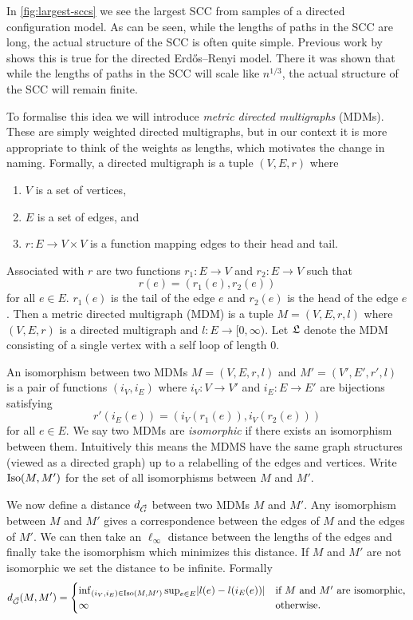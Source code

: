 In \cref{fig:largest-sccs} we see the largest SCC from samples of a directed configuration model. As can be seen, while the lengths of paths in the SCC are long, the actual structure of the SCC is often quite simple. Previous work by \citet{goldschmidtScalingLimitCritical2019} shows this is true for the directed Erdős--Renyi model. There it was shown that while the lengths of paths in the SCC will scale like $n^{1/3}$, the actual structure of the SCC will remain finite.

To formalise this idea we will introduce \emph{metric directed multigraphs} (MDMs). These are simply weighted directed multigraphs, but in our context it is more appropriate to think of the weights as lengths, which motivates the change in naming. Formally, a directed multigraph is a tuple $(V, E, r)$ where
\begin{enumerate}
    \item $V$ is a set of vertices,
    \item $E$ is a set of edges, and
    \item $r: E \to V \times V$ is a function mapping edges to their head and tail.
\end{enumerate}
Associated with $r$ are two functions $r_1: E \to V$ and $r_2: E \to V$ such that
\begin{equation*}
    r(e) = (r_1(e), r_2(e))
\end{equation*}
for all $e \in E$. $r_1(e)$ is the tail of the edge $e$ and $r_2(e)$ is the head of the edge $e$. Then a metric directed multigraph (MDM) is a tuple $M = (V, E, r, l)$ where $(V, E, r)$ is a directed multigraph and $l:E \to [0, \infty)$. Let $\mathfrak L$ denote the MDM consisting of a single vertex with a self loop of length 0.

An isomorphism between two MDMs $M = (V, E, r, l)$ and $M' = (V', E', r', l)$ is a pair of functions $(i_V, i_E)$ where $i_V: V \to V'$ and $i_E: E \to E'$ are bijections satisfying
\begin{equation*}
    r'(i_E(e)) = (i_V(r_1(e)), i_V(r_2(e)))
\end{equation*}
for all $e \in E$. We say two MDMs are \emph{isomorphic} if there exists an isomorphism between them. Intuitively this means the MDMS have the same graph structures (viewed as a directed graph) up to a relabelling of the edges and vertices. Write $\operatorname{Iso}(M, M')$ for the set of all isomorphisms between $M$ and $M'$.

We now define a distance $d_{\vec{G}}$ between two MDMs $M$ and $M'$.  Any isomorphism between $M$ and $M'$ gives a correspondence between the edges of $M$ and the edges of $M'$. We can then take an $\ell_{\infty}$ distance between the lengths of the edges and finally take the isomorphism which minimizes this distance. If $M$ and $M'$ are not isomorphic we set the distance to be infinite. Formally
\begin{equation*}
    d_{\vec{G}}(M, M') = \begin{cases}
        \inf_{(i_V, i_E) \in \operatorname{Iso}(M, M')} \sup_{e \in E} \lvert l(e) - l(i_E(e))\rvert & \text{if $M$ and $M'$ are isomorphic,} \\
        \infty & \text{otherwise.}
    \end{cases}
\end{equation*}

